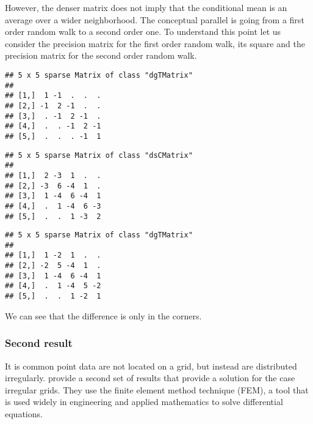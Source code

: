 However, the denser matrix does not imply that the 
conditional mean is an average over a wider neighborhood. 
The conceptual parallel is going from a 
first order random walk to a second order one. 
To understand this point let us consider the precision 
matrix for the first order random walk, 
its square and the precision matrix for the 
second order random walk. 
\begin{knitrout}
\color{fgcolor}\begin{kframe}
\begin{alltt}
 \hlkwb{<-} \hlopt{:::}\hlstd{(}\hlstd{=}\hlstd{))}
\end{alltt}
\begin{verbatim}
## 5 x 5 sparse Matrix of class "dgTMatrix"
##                    
## [1,]  1 -1  .  .  .
## [2,] -1  2 -1  .  .
## [3,]  . -1  2 -1  .
## [4,]  .  . -1  2 -1
## [5,]  .  .  . -1  1
\end{verbatim}
\begin{alltt}
 
\end{alltt}
\begin{verbatim}
## 5 x 5 sparse Matrix of class "dsCMatrix"
##                    
## [1,]  2 -3  1  .  .
## [2,] -3  6 -4  1  .
## [3,]  1 -4  6 -4  1
## [4,]  .  1 -4  6 -3
## [5,]  .  .  1 -3  2
\end{verbatim}
\begin{alltt}
\hlopt{:::}\hlstd{(}\hlstd{=}\hlstd{)}
\end{alltt}
\begin{verbatim}
## 5 x 5 sparse Matrix of class "dgTMatrix"
##                    
## [1,]  1 -2  1  .  .
## [2,] -2  5 -4  1  .
## [3,]  1 -4  6 -4  1
## [4,]  .  1 -4  5 -2
## [5,]  .  .  1 -2  1
\end{verbatim}
\end{kframe}
\end{knitrout}
We can see that the difference 
is only in the corners.

\subsubsection{Second result}\label{sec:secres}

It is common point data are not located on a grid, 
but instead are distributed irregularly.  
\cite{lindgrenRL:2011} provide a second set of results 
that provide a solution for the case irregular grids. 
They use the finite element method technique (FEM), 
a tool that is used widely in 
engineering and applied mathematics 
to solve differential equations. 

